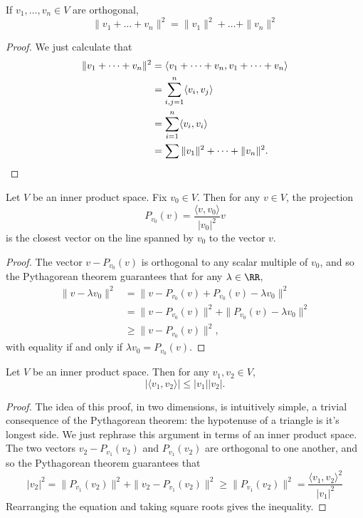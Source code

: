 \begin{theorem}
    If $v_1,\dots,v_n \in V$ are orthogonal,
    \[ \| v_1 + \dots + v_n \|^2 = \| v_1 \|^2 + \dots + \| v_n \|^2 \]
\end{theorem}
\begin{proof}
    We just calculate that
    \begin{align*}
        \| v_1 + \dots + v_n \|^2 &= \langle v_1 + \dots + v_n, v_1 + \dots + v_n \rangle\\
        &= \sum_{i,j = 1}^n \langle v_i, v_j \rangle\\
        &= \sum_{i = 1}^n \langle v_i, v_i \rangle\\
        &= \sum \| v_1 \|^2 + \dots + \| v_n \|^2. \qedhere
    \end{align*}
\end{proof}

\begin{corollary}
    Let $V$ be an inner product space. Fix $v_0 \in V$. Then for any $v \in V$, the projection
    \[ P_{v_0}(v) = \frac{\langle v, v_0 \rangle}{|v_0|^2} v \]
    is the closest vector on the line spanned by $v_0$ to the vector $v$.
\end{corollary}
\begin{proof}
    The vector $v - P_{v_0}(v)$ is orthogonal to any scalar multiple of $v_0$, and so the Pythagorean theorem guarantees that for any $\lambda \in \RR$,
    \begin{align*}
        \| v - \lambda v_0 \|^2 &= \| v - P_{v_0}(v) + P_{v_0}(v) - \lambda v_0 \|^2\\
        &= \| v - P_{v_0}(v) \|^2 + \| P_{v_0}(v) - \lambda v_0 \|^2\\
        &\geq \| v - P_{v_0}(v) \|^2,
    \end{align*}
    with equality if and only if $\lambda v_0 = P_{v_0}(v)$.
\end{proof}

\begin{theorem}
    Let $V$ be an inner product space. Then for any $v_1,v_2 \in V$,
    \[ |\langle v_1, v_2 \rangle| \leq |v_1||v_2|. \]
\end{theorem}
\begin{proof}
    The idea of this proof, in two dimensions, is intuitively simple, a trivial consequence of the Pythagorean theorem: the hypotenuse of a triangle is it's longest side. We just rephrase this argument in terms of an inner product space. The two vectors $v_2 - P_{v_1}(v_2)$ and $P_{v_1}(v_2)$ are orthogonal to one another, and so the Pythagorean theorem guarantees that
    \[ |v_2|^2 = \| P_{v_1}(v_2) \|^2 + \| v_2 - P_{v_1}(v_2) \|^2 \geq \| P_{v_1}(v_2) \|^2 = \frac{\langle v_1, v_2 \rangle^2}{|v_1|^2} \]
    Rearranging the equation and taking square roots gives the inequality.
\end{proof}

